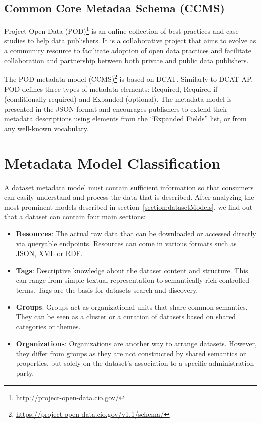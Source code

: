 \subsection{Common Core Metadaa Schema (CCMS)}
Project Open Data (POD)\footnote{\url{http://project-open-data.cio.gov/}} is an online collection of best practices and case studies to help data publishers. It is a collaborative project that aims to evolve as a community resource to facilitate adoption of open data practices and facilitate collaboration and partnership between both private and public data publishers.

The POD metadata model (CCMS)\footnote{\url{https://project-open-data.cio.gov/v1.1/schema/}} is based on DCAT. Similarly to DCAT-AP, POD defines three types of metadata elements: Required, Required-if (conditionally required) and Expanded (optional). The metadata model is presented in the JSON format and encourages publishers to extend their metadata descriptions using elements from the ``Expanded Fields'' list, or from any well-known vocabulary.


\section{Metadata Model Classification}
\label{section:harmonized_metadata}
A dataset metadata model must contain sufficient information so that consumers can easily understand and process the data that is described. After analyzing the most prominent models described in section~\ref{section:datasetModels}, we find out that a dataset can contain four main sections:
\begin{itemize}
  \item \textbf{Resources}: The actual raw data that can be downloaded or accessed directly via queryable endpoints. Resources can come in various formats such as JSON, XML or RDF.
  \item \textbf{Tags}: Descriptive knowledge about the dataset content and structure. This can range from simple textual representation to semantically rich controlled terms. Tags are the basis for datasets search and discovery.
  \item \textbf{Groups}: Groups act as organizational units that share common semantics. They can be seen as a cluster or a curation of datasets based on shared categories or themes.
  \item \textbf{Organizations}: Organizations are another way to arrange datasets. However, they differ from groups as they are not constructed by shared semantics or properties, but solely on the dataset's association to a specific administration party.
\end{itemize}


